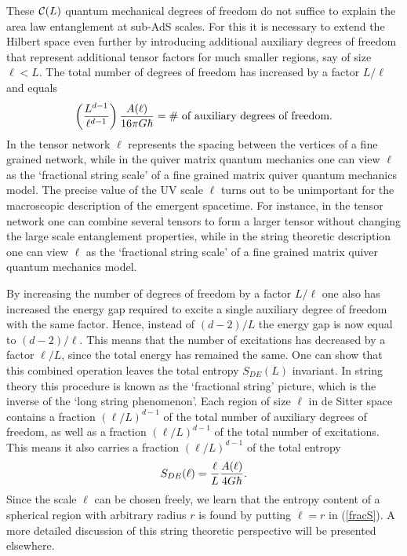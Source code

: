 \documentclass[a4paper,12pt]{article}
\newcommand{\be}{\begin{equation}}
\newcommand{\ee}{\end{equation}}
\begin{document}
These  ${\cal C}(L)$ quantum mechanical degrees of freedom do not suffice to explain the area law entanglement at sub-AdS scales. For this it is necessary to extend the Hilbert space even further by introducing additional auxiliary degrees of freedom that represent additional tensor factors for much smaller regions, say of size $\ell<\!\!L$.  The total number of degrees of freedom has increased by a factor $L/\ell$ and equals
\be
\left({L^{d-1}\over \ell^{d-1}}\right) {A(\ell)\over 16\pi G\hbar} =  \mbox{\# of auxiliary degrees of freedom}. %
\ee
In the tensor network $\ell$ represents the spacing between the vertices of a fine grained 
network, while in the quiver matrix quantum mechanics one can view $\ell$ as the `fractional string scale' of a fine grained matrix quiver quantum mechanics model. The precise value of the UV scale $\ell$ turns out to be unimportant for the 
macroscopic description of the emergent spacetime.  For instance, in the tensor network one can combine several tensors to form a larger tensor without changing the large scale entanglement properties, while in the string theoretic description one can view $\ell$ as the `fractional string scale' of a  fine grained matrix quiver quantum mechanics model.  

By increasing the number of degrees of freedom by a factor $L/\ell$ one also has increased the energy gap required to excite a single auxiliary degree of freedom with the same factor. Hence, instead of $(d-2)/L$ the energy gap is now equal to
$(d-2)/\ell$.   This means that  the number of excitations has decreased by a factor $\ell/L$, since the total energy has remained the same.  One can show that this combined operation leaves the total entropy $S_{DE}(L)$  invariant. 
In string theory this procedure is known as the  `fractional string' picture, which is the inverse of the `long string phenomenon'. 
 Each region of size $\ell$ in de Sitter space contains a fraction $(\ell/L)^{d-1}$ of the total 
 number of auxiliary degrees of freedom, as well as a fraction $(\ell/L)^{d-1}$ of the total number of excitations.  This means it also carries a fraction $(\ell/L)^{d-1}$  of the total entropy    
 \be
 \label{fracS}
 S_{DE}(\ell)  = {\ell\over L} {A(\ell)\over 4G\hbar}.
 \ee
Since the scale $\ell$ can be chosen freely, we learn that the entropy content of a spherical region with arbitrary radius $r$ is found by putting $\ell =r$ in (\ref{fracS}).  A more detailed discussion of this string theoretic perspective will be presented elsewhere. 
\end{document}
